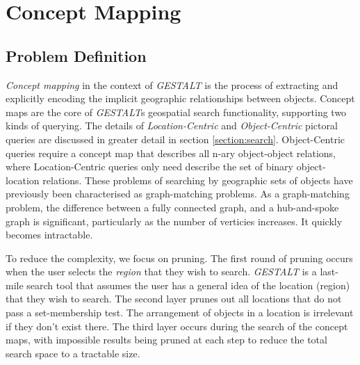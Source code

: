 \section{Concept Mapping}
\label{section:concept}

\subsection{Problem Definition}
\emph{Concept mapping} in the context of \emph{GESTALT} is the process of extracting and explicitly encoding the implicit geographic relationships between objects. 
Concept maps are the core of \emph{GESTALT}s geospatial search functionality, supporting two kinds of querying. 
The details of \emph{Location-Centric} and \emph{Object-Centric} pictoral queries are discussed in greater detail in section \ref{section:search}.
Object-Centric queries require a concept map that describes all n-ary object-object relations, where Location-Centric queries only need describe the set of binary object-location relations.
These problems of searching by geographic sets of objects have previously been characterised as graph-matching problems. 
As a graph-matching problem, the difference between a fully connected graph, and a hub-and-spoke graph is significant, particularly as the number of verticies increases. It quickly becomes intractable. 


To reduce the complexity, we focus on pruning. 
The first round of pruning occurs when the user selects the \emph{region} that they wish to search. 
\emph{GESTALT} is a last-mile search tool that assumes the user has a general idea of the location (region) that they wish to search. 
The second layer prunes out all locations that do not pass a set-membership test. The arrangement of objects in a location is irrelevant if they don't exist there. 
The third layer occurs during the search of the concept maps, with impossible results being pruned at each step to reduce the total search space to a tractable size. 


